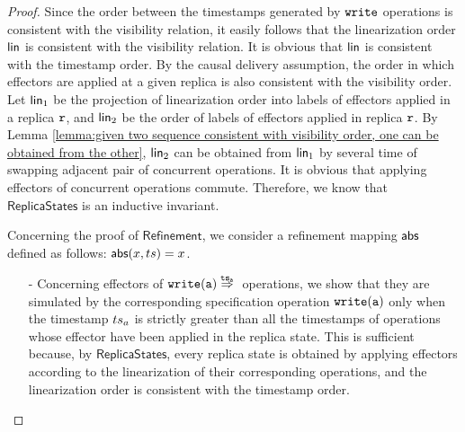\begin {proof}



Since the order between the timestamps generated by ${\tt write}$ operations is consistent with the visibility relation, it easily follows that the linearization order $\mathsf{lin}$ is consistent with the visibility relation. It is obvious that $\mathsf{lin}$ is consistent with the timestamp order. By the causal delivery assumption, the order in which effectors are applied at a given replica is also consistent with the visibility order. Let $\mathsf{lin}_1$ be the projection of linearization order into labels of effectors applied in a replica $\mathtt{r}$, and $\mathsf{lin}_2$ be the order of labels of effectors applied in replica $\mathtt{r}$. By Lemma \ref{lemma:given two sequence consistent with visibility order, one can be obtained from the other}, $\mathsf{lin}_2$ can be obtained from $\mathsf{lin}_1$ by several time of swapping adjacent pair of concurrent operations. It is obvious that applying effectors of concurrent operations commute. Therefore, we know that $\mathsf{ReplicaStates}$ is an inductive invariant.

Concerning the proof of $\mathsf{Refinement}$, we consider a refinement mapping $\mathsf{abs}$ defined as follows: $\mathsf{abs}(x,ts) = x$.

\begin{itemize}
\setlength{\itemsep}{0.5pt}
\item[-] Concerning effectors of $\alabellongind[{\tt write}]{a}{}{\ats_a}{}$ operations, we show that they are simulated by the corresponding specification operation $\alabelshort[{\tt write}]{a}$ only when the timestamp $ts_a$ is strictly greater than all the timestamps of operations whose effector have been applied in the replica state. This is sufficient because, by $\mathsf{ReplicaStates}$, every replica state is obtained by applying effectors according to the linearization of their corresponding operations, and the linearization order is consistent with the timestamp order.



\end{itemize}
\end{proof}
